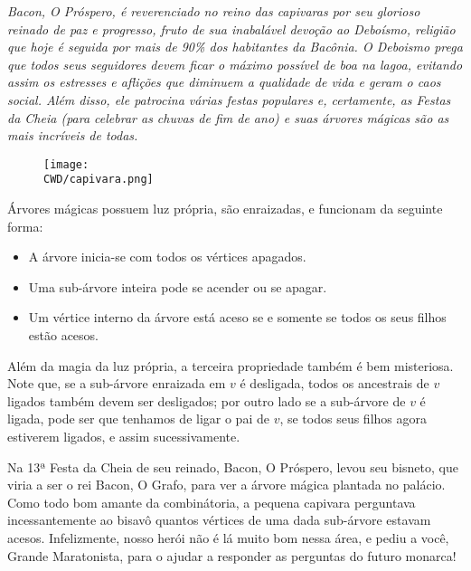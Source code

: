 %

\textit{Bacon, O Próspero, é reverenciado no reino das capivaras por seu glorioso reinado de paz e progresso, fruto de sua inabalável devoção ao Deboísmo,
religião que hoje é seguida por mais de 90\% dos habitantes da Bacônia. O Deboismo prega que todos seus seguidores devem ficar o máximo possível
de boa na lagoa, evitando assim os estresses e aflições que diminuem a qualidade de vida e geram o caos social. Além disso, ele patrocina várias festas
populares e, certamente, as Festas da Cheia (para celebrar as chuvas de fim de ano) e suas árvores mágicas são as mais incríveis de todas.}

\begin{figure}[H]
  \centering
  \texttt{[image: \\CWD/capivara.png]}
\end{figure}

Árvores mágicas possuem luz própria, são enraizadas, e funcionam da seguinte forma:

\begin{itemize}
	\item A árvore inicia-se com todos os vértices apagados.
	\item Uma sub-árvore inteira pode se acender ou se apagar.
	\item Um vértice interno da árvore está aceso se e somente se todos os seus filhos estão acesos.
\end{itemize}

Além da magia da luz própria, a terceira propriedade também é bem misteriosa. Note que, se a sub-árvore enraizada em $v$ é desligada,
todos os ancestrais de $v$ ligados também devem ser desligados; por outro lado se a sub-árvore de $v$ é ligada, pode ser que tenhamos de ligar o pai de $v$,
se todos seus filhos agora estiverem ligados, e assim sucessivamente.

Na 13ª Festa da Cheia de seu reinado, Bacon, O Próspero, levou seu bisneto, que viria a ser o rei Bacon, O Grafo, para ver a árvore mágica plantada
no palácio. Como todo bom amante da combinátoria, a pequena capivara perguntava incessantemente ao bisavô quantos vértices de uma dada sub-árvore estavam acesos.
Infelizmente, nosso herói não é lá muito bom nessa área, e pediu a você, Grande Maratonista, para o ajudar a responder as perguntas do futuro monarca!

